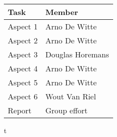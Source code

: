 \documentclass{article}
\begin{document}
\begin{center}
	\begin{tabular}{ | l | l |}
		\hline
		\textbf{Task} & \textbf{Member}  \\ \hline
		Aspect 1      & Arno De Witte    \\ \hline
		Aspect 2      & Arno De Witte    \\ \hline
		Aspect 3      & Douglas Horemans \\ \hline
		Aspect 4      & Arno De Witte    \\ \hline
		Aspect 5      & Arno De Witte    \\ \hline
		Aspect 6      & Wout Van Riel    \\ \hline
		Report        & Group effort     \\ \hline
	\end{tabular}
\end{center}t
\end{document}
